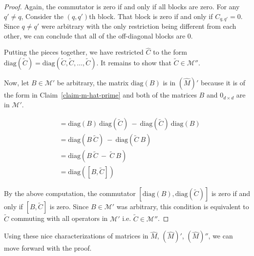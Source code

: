 \documentclass[12pt]{article}
\theoremstyle{plain}
\begin{document}
\begin{proof}
Again, the commutator is zero if and only if all blocks are zero. For any $q' \neq q$, Consider the $(q, q')$th block. That block is zero if and only if $C_{q,q'} = 0$. Since $q \neq q'$ were arbitrary with the only restriction being different from each other, we can conclude that all of the off-diagonal blocks are $0$.

Putting the pieces together, we have restricted $\widehat{C}$ to the form $\text{diag}(\widetilde{C}) = \text{diag}(\widetilde{C}, \widetilde{C}, \dots, \widetilde{C})$. It remains to show that $\widetilde{C} \in \mathcal{M}''$.

Now, let $B \in \mathcal{M}'$ be arbitrary, the matrix $\text{diag}(B)$ is in $(\widehat{M})'$ because it is of the form in Claim~\ref{claim-m-hat-prime} and both of the matrices $B$ and $0_{d\times d}$ are in $\mathcal{M}'$.

\begin{align*}
    [\text{diag}(B), \text{diag}(\widetilde{C})] &= \text{diag}(B) \ \text{diag}(\widetilde{C}) \ - \ \text{diag}(\widetilde{C}) \ \text{diag}(B) \\
    &= \text{diag}(B\ \widetilde{C}) \ -  \ \text{diag}( \widetilde{C} \ B)\\
    &= \text{diag}(B\ \widetilde{C}\ -  \ \widetilde{C} \ B)\\
    &= \text{diag}([B, \widetilde{C}])
\end{align*}

By the above computation, the commutator $[\text{diag}(B), \text{diag}(\widetilde{C})]$ is zero if and only if $[B, \widetilde{C}]$ is zero. Since $B \in \mathcal{M}'$ was arbitrary, this condition is equivalent to $\widetilde{C}$ commuting with all operators in $\mathcal{M}'$  i.e. $\widetilde{C} \in \mathcal{M}''$.


\end{proof}
Using these nice characterizations of matrices in $\widehat{M}$, $(\widehat{M})'$, $(\widehat{M})''$, we can move forward with the proof.
\end{document}

